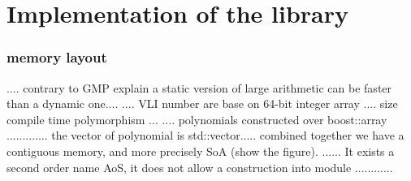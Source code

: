 \documentclass[oribibl]{llncs2e/llncs}
\begin{document}





\section{Implementation of the library}
\subsubsection{memory layout}

.... contrary to GMP  explain a static version of large arithmetic can be faster than a dynamic one....   ....   VLI number are base on 64-bit integer array .... size compile time polymorphism ...
.... polynomials constructed over boost::array ............. the vector of polynomial is std::vector..... combined together we have a contiguous memory, and more precisely  SoA (show the figure). 
...... It exists a second order name AoS, it does not allow a construction into module ............  
\end{document}
